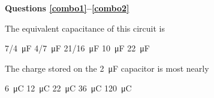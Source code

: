 \documentclass{../../oss-classkick-exam}
\begin{document}
\genheader


\genmultidirections

\gengravity

\textbf{Questions \ref{combo1}--\ref{combo2}}
\begin{center}
\end{center}

\begin{questions}
  \question The equivalent capacitance of this circuit is
  \label{combo1}
  \begin{choices}
    \choice\SI{7/4}{\micro\farad}
    \choice\SI{4/7}{\micro\farad}
    \choice\SI{21/16}{\micro\farad}
    \choice\SI{10}{\micro\farad}
    \choice\SI{22}{\micro\farad}
  \end{choices}
  
  \question The charge stored on the \SI{2}{\micro\farad} capacitor is most
  nearly
  \label{combo2}
  \begin{choices}
    \choice\SI{6}{\micro\coulomb}
    \choice\SI{12}{\micro\coulomb}
    \choice\SI{22}{\micro\coulomb}
    \choice\SI{36}{\micro\coulomb}
    \choice\SI{120}{\micro\coulomb}
  \end{choices}


\end{questions}
\end{document}
